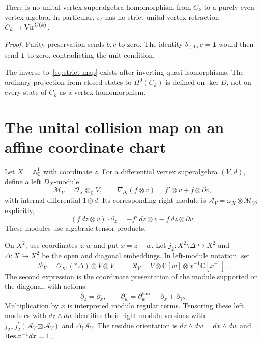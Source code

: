 \begin{proposition}\label{prop:no-forward-map}
There is no unital vertex superalgebra homomorphism from $C_k$ to a purely even vertex algebra.
In particular, $\iota_T$ has no strict unital vertex retraction $C_k\to\operatorname{Vir}^{C(k)}$.
\end{proposition}
\begin{proof}
Parity preservation sends $b,c$ to zero.
The identity $b_{(0)}c=\mathbf1$ would then send $\mathbf1$ to zero, contradicting the unit condition.
\end{proof}
The inverse to~\eqref{eq:strict-map} exists after inverting quasi-isomorphisms.
The ordinary projection from closed states to $H^0(C_k)$ is defined on $\ker D$, not on every state of $C_k$ as a vertex homomorphism.

\section{The unital collision map on an affine coordinate chart}

Let $X=\mathbb A^1_{\mathbb C}$ with coordinate $z$.
For a differential vertex superalgebra $(V,d)$, define a left $D_X$-module
\[
 \mathcal M_V=\mathcal O_X\otimes_{\mathbb C}V,
 \qquad \nabla_{\partial_z}(f\otimes v)=f'\otimes v+f\otimes\partial v,
\]
with internal differential $1\otimes d$.
Its corresponding right module is $\mathcal A_V=\omega_X\otimes\mathcal M_V$; explicitly,
\begin{equation}\label{eq:right-connection}
 (f\,dz\otimes v)\cdot\partial_z
 =-f'\,dz\otimes v-f\,dz\otimes\partial v.
\end{equation}
These modules use algebraic tensor products.

On $X^2$, use coordinates $z,w$ and put $x=z-w$.
Let $j_2:X^2\setminus\Delta\hookrightarrow X^2$ and $\Delta:X\hookrightarrow X^2$ be the open and diagonal embeddings.
In left-module notation, set
\[
 \mathcal P_V=\mathcal O_{X^2}(*\Delta)\otimes V\otimes V,
 \qquad
 \mathcal R_V=V\otimes\mathbb C[w]\otimes x^{-1}\mathbb C[x^{-1}].
\]
The second expression is the coordinate presentation of the module supported on the diagonal, with actions
\begin{equation}\label{eq:diagonal-connection}
 \partial_z=\partial_x,
 \qquad \partial_w=\partial_w^{\mathrm{base}}-\partial_x+\partial_V.
\end{equation}
Multiplication by $x$ is interpreted modulo regular terms.
Tensoring these left modules with $dz\wedge dw$ identifies their right-module versions with
$j_{2*}j_2^*(\mathcal A_V\boxtimes\mathcal A_V)$ and $\Delta_!\mathcal A_V$.
The residue orientation is $dz\wedge dw=dx\wedge dw$ and $\operatorname{Res} x^{-1}dx=1$.

